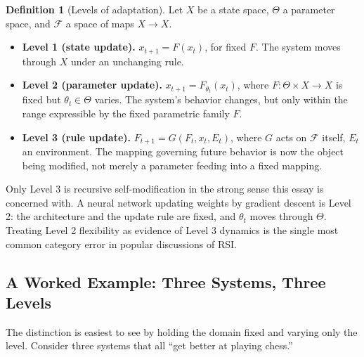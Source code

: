 \documentclass[12pt,a4paper]{article}
\theoremstyle{plain}
\theoremstyle{definition}
\newtheorem{definition}[theorem]{Definition}
\theoremstyle{remark}
\begin{document}
\begin{definition}[Levels of adaptation]
\label{def:levels}
Let $X$ be a state space, $\Theta$ a parameter space, and $\mathcal{F}$ a space of maps $X \to X$.
\begin{itemize}
  \item \textbf{Level 1 (state update).} $x_{t+1} = F(x_t)$, for fixed $F$. The system moves through $X$ under an unchanging rule.
  \item \textbf{Level 2 (parameter update).} $x_{t+1} = F_{\theta_t}(x_t)$, where $F: \Theta \times X \to X$ is fixed but $\theta_t \in \Theta$ varies. The system's behavior changes, but only within the range expressible by the fixed parametric family $F$.
  \item \textbf{Level 3 (rule update).} $F_{t+1} = G(F_t, x_t, E_t)$, where $G$ acts on $\mathcal{F}$ itself, $E_t$ an environment. The mapping governing future behavior is now the object being modified, not merely a parameter feeding into a fixed mapping.
\end{itemize}
\end{definition}

Only Level 3 is recursive self-modification in the strong sense this essay is concerned with. A neural network updating weights by gradient descent is Level 2: the architecture and the update rule are fixed, and $\theta_t$ moves through $\Theta$. Treating Level 2 flexibility as evidence of Level 3 dynamics is the single most common category error in popular discussions of RSI.

\subsection{A Worked Example: Three Systems, Three Levels}
\label{subsec:worked-three-levels}

The distinction is easiest to see by holding the domain fixed and varying only the level. Consider three systems that all ``get better at playing chess.''
\end{document}
